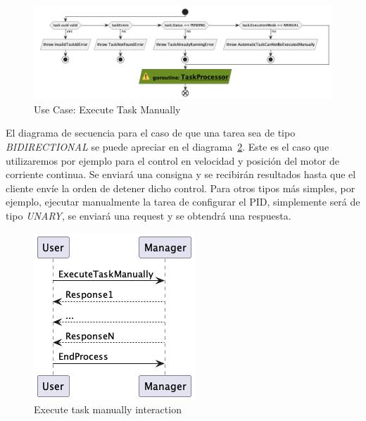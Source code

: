 \begin{itemize}
    \begin{figure}[H]
        \centering
        \includegraphics[height=0.2\textheight]{./part/Proyecto_ejecutivo/memoria_descriptiva/descripcionDelProyecto/manager/uml/1-executeTaskManual}
        \caption{Use Case: Execute Task Manually}\label{fig:Use Case-Execute Task Manually}
    \end{figure}

    El diagrama de secuencia para el caso de que una tarea sea de tipo \textit{BIDIRECTIONAL} se puede apreciar en el diagrama~\cref{fig:executeTaskManualInteraction}.
    Este es el caso que utilizaremos por ejemplo para el control en velocidad y posición del motor de corriente continua.
    Se enviará una consigna y se recibirán resultados hasta que el cliente envíe la orden de detener dicho control.
    Para otros tipos más simples, por ejemplo, ejecutar manualmente la tarea de configurar el PID, simplemente será de tipo \textit{UNARY}, se enviará una request y se obtendrá una respuesta.

    \begin{figure}[H]
        \centering
        \includegraphics[height=0.2\textheight]{./part/Proyecto_ejecutivo/memoria_descriptiva/descripcionDelProyecto/manager/uml/1-ExecuteTaskManuallyInteraction}
        \caption{Execute task manually interaction}\label{fig:executeTaskManualInteraction}
    \end{figure}
\end{itemize}


